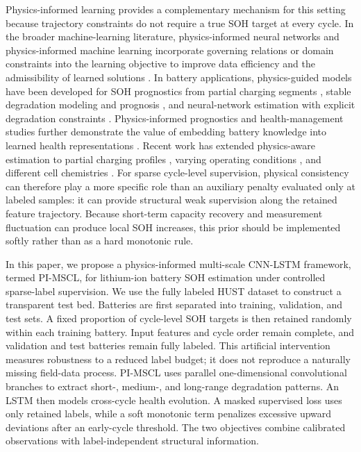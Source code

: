 \documentclass[pdflatex,sn-mathphys-num]{sn-jnl}
\begin{document}
Physics-informed learning provides a complementary mechanism for this setting because trajectory constraints do not require a true SOH target at every cycle. In the broader machine-learning literature, physics-informed neural networks and physics-informed machine learning incorporate governing relations or domain constraints into the learning objective to improve data efficiency and the admissibility of learned solutions \cite{raissi2019physics,karniadakis2021physics}. In battery applications, physics-guided models have been developed for SOH prognostics from partial charging segments \cite{kohtz2022physics}, stable degradation modeling and prognosis \cite{wang2024physics}, and neural-network estimation with explicit degradation constraints \cite{ye2024method}. Physics-informed prognostics and health-management studies further demonstrate the value of embedding battery knowledge into learned health representations \cite{wen2023physics}. Recent work has extended physics-aware estimation to partial charging profiles \cite{gu2026real}, varying operating conditions \cite{lin2025physics}, and different cell chemistries \cite{lin2025lightweight}. For sparse cycle-level supervision, physical consistency can therefore play a more specific role than an auxiliary penalty evaluated only at labeled samples: it can provide structural weak supervision along the retained feature trajectory. Because short-term capacity recovery and measurement fluctuation can produce local SOH increases, this prior should be implemented softly rather than as a hard monotonic rule.

In this paper, we propose a physics-informed multi-scale CNN-LSTM framework, termed PI-MSCL, for lithium-ion battery SOH estimation under controlled sparse-label supervision. We use the fully labeled HUST dataset to construct a transparent test bed. Batteries are first separated into training, validation, and test sets. A fixed proportion of cycle-level SOH targets is then retained randomly within each training battery. Input features and cycle order remain complete, and validation and test batteries remain fully labeled. This artificial intervention measures robustness to a reduced label budget; it does not reproduce a naturally missing field-data process. PI-MSCL uses parallel one-dimensional convolutional branches to extract short-, medium-, and long-range degradation patterns. An LSTM then models cross-cycle health evolution. A masked supervised loss uses only retained labels, while a soft monotonic term penalizes excessive upward deviations after an early-cycle threshold. The two objectives combine calibrated observations with label-independent structural information.
\end{document}
